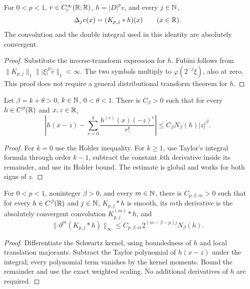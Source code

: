 \begin{lemma}
  \label{lem:c12_block_factorization}
  For $0<p<1$, $v\in C_c^\infty(\mathbb{R};\mathbb{R})$, $h=|D|^pv$, and every $j\in\mathbb{N}$,
  \[
    \Delta_jv(x)=(K_{p,j}*h)(x)\qquad(x\in\mathbb{R}).
  \]
  The convolution and the double integral used in this identity are absolutely convergent.
\end{lemma}
\begin{proof}
  Substitute the inverse-transform expression for $h$. Fubini follows from
  $\|K_{p,j}\|_1\||\xi|^p\widehat v\|_1<\infty$.
  The two symbols multiply to $\varphi(2^{-j}\xi)$, also at zero.
  This proof does not require a general distributional transform theorem for $h$.
\end{proof}

\begin{lemma}
  \label{lem:c12_holder_taylor}
  Let $\beta=k+\theta>0$, $k\in\mathbb{N}$, $0<\theta<1$.
  There is $C_\beta>0$ such that for every $h\in C^\beta(\mathbb{R})$ and $x,z\in\mathbb{R}$,
  \[
    \left|h(x-z)-\sum_{r=0}^k\frac{h^{(r)}(x)(-z)^r}{r!}\right|
        \le C_\beta N_\beta(h)|z|^\beta.
  \]
\end{lemma}
\begin{proof}
  For $k=0$ use the Holder inequality. For $k\ge1$, use Taylor's integral formula through
  order $k-1$, subtract the constant $k$th derivative inside its remainder, and use its
  Holder bound. The estimate is global and works for both signs of $z$.
\end{proof}

\begin{lemma}
  \label{lem:c12_block_derivative_bound}
  For $0<p<1$, noninteger $\beta>0$, and every $m\in\mathbb{N}$, there is
  $C_{p,\beta,m}>0$ such that for every $h\in C^\beta(\mathbb{R})$ and $j\in\mathbb{N}$,
  $K_{p,j}*h$ is smooth, its $m$th derivative is the absolutely convergent convolution
  $K_{p,j}^{(m)}*h$, and
  \[
    \|\partial^m(K_{p,j}*h)\|_\infty
        \le C_{p,\beta,m}2^{(m-\beta-p)j}N_\beta(h).
  \]
\end{lemma}
\begin{proof}
  Differentiate the Schwartz kernel, using boundedness of $h$ and local translation majorants.
  Subtract the Taylor polynomial of $h(x-z)$ under the integral; every polynomial term
  vanishes by the kernel moments. Bound the remainder and use the exact weighted scaling.
  No additional derivatives of $h$ are required.
\end{proof}

